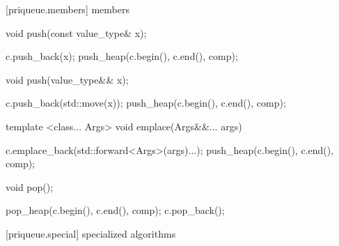[priqueue.members]{ members}

%
\begin{itemdecl}
void push(const value_type& x);
\end{itemdecl}

\begin{itemdescr}
\pnum
\effects
\begin{codeblock}
c.push_back(x);
push_heap(c.begin(), c.end(), comp);
\end{codeblock}
\end{itemdescr}

%
\begin{itemdecl}
void push(value_type&& x);
\end{itemdecl}

\begin{itemdescr}
\pnum
\effects
\begin{codeblock}
c.push_back(std::move(x));
push_heap(c.begin(), c.end(), comp);
\end{codeblock}
\end{itemdescr}

%
%
\begin{itemdecl}
template <class... Args> void emplace(Args&&... args)
\end{itemdecl}

\begin{itemdescr}
\pnum
\effects
\begin{codeblock}
c.emplace_back(std::forward<Args>(args)...);
push_heap(c.begin(), c.end(), comp);
\end{codeblock}
\end{itemdescr}


%
\begin{itemdecl}
void pop();
\end{itemdecl}

\begin{itemdescr}
\pnum
\effects
\begin{codeblock}
pop_heap(c.begin(), c.end(), comp);
c.pop_back();
\end{codeblock}
\end{itemdescr}

[priqueue.special]{ specialized algorithms}

